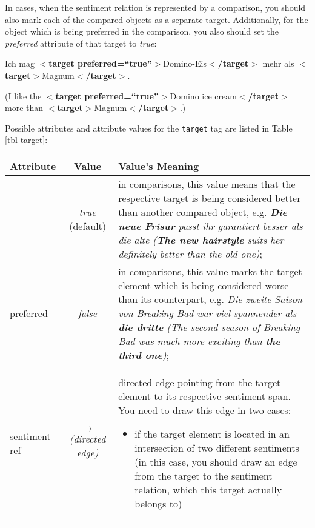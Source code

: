 \documentclass[11pt,a4paper]{article}
\newcommand{\xmltag}[1]{{\textbf{\small$<$#1$>$}}}
\newcommand{\target}[1]{\xmltag{target}#1\xmltag{/target}}
\newlength\clmnwidth
\newenvironment{myexe}{
  \begin{exe}
    \ex\begin{center}
    \itshape
}{
    \end{center}
  \end{exe}
}
\begin{document}
In cases, when the sentiment relation is represented by a comparison,
you should also mark each of the compared objects as a separate
target.  Additionally, for the object which is being preferred in the
comparison, you also should set the \textit{preferred} attribute of
that target to \textit{true}:
\begin{myexe}
  Ich mag $<$\textbf{target
    preferred=``true''}$>$Domino-Eis$<$\textbf{/target}$>$ mehr als
  \target{Magnum}.

  (I like the $<$\textbf{target preferred=``true''}$>$Domino ice
  cream$<$\textbf{/target}$>$ more than \target{Magnum}.)
\end{myexe}

Possible attributes and attribute values for the \texttt{target} tag
are listed in Table \ref{tbl-target}:
\begin{center}
  \begin{tabular}{|l|c|p{\clmnwidth}|}\hline
    Attribute & Value & Value's Meaning\\\hline\label{tbl-target}

    & \textit{true} (default) & in comparisons, this value means that
    the respective target is being considered better than another
    compared object, e.g. \textit{\textbf{Die neue Frisur} passt ihr
      garantiert besser als die alte (\textbf{The new hairstyle} suits
      her definitely better than the old one)};\\\cline{2-3}

    \multirow{-2}{*}{preferred} & \textit{false} & in comparisons,
    this value marks the target element which is being considered
    worse than its counterpart, e.g. \textit{Die zweite Saison von
      Breaking Bad war viel spannender als \textbf{die dritte} (The
      second season of Breaking Bad was much more exciting than
      \textbf{the third one})};\\\hline

    sentiment-ref & \textit{$\longrightarrow$\newline(directed edge)}
    & directed edge pointing from the target element to its respective
    sentiment span.  You need to draw this edge in two cases:
    \begin{itemize}
    \item if the target element is located in an intersection of two
      different sentiments (in this case, you should draw an edge from
      the target to the sentiment relation, which this target actually
      belongs to)


\end{itemize}
\end{tabular}
\end{center}
\end{document}
